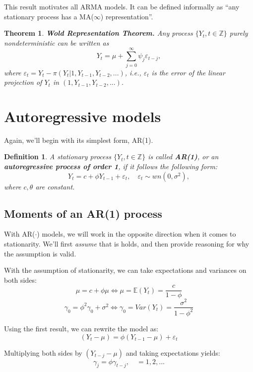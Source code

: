 \documentclass[11pt, a4paper]{report}
\theoremstyle{plain}
\newtheorem{thm}{Theorem}[section]
\theoremstyle{plain}
\newtheorem{defn}{Definition}[section]
\theoremstyle{remark}
\begin{document}
This result motivates all ARMA models. It can be defined informally as ``any stationary process has a MA($\infty$) representation''.

\begin{thm}{\textbf{Wold Representation Theorem.}}
	Any process $\{Y_t, t \in \mathbb{Z} \}$ purely nondeterministic can be written as
	$$ Y_t = \mu + \sum_{j=0}^{\infty} \psi_j \varepsilon_{t-j}, $$
	where $\varepsilon_{t} = Y_t - \pi(Y_t | 1, Y_{t-1}, Y_{t-2}, ...)$, i.e., $\varepsilon_{t}$ is the \textit{error of the linear projection of $Y_t$ in $(1, Y_{t-1}, Y_{t-2}, ...)$}.
\end{thm}

\section{Autoregressive models}

Again, we'll begin with its simplest form, AR(1).

\begin{defn} \label{ar1-def}
	A stationary process $\{Y_t, t \in \mathbb{Z} \}$ is called \textbf{AR(1)}, or an \textbf{autoregressive process of order 1}, if it follows the following form:
	$$ Y_t = c + \phi Y_{t-1} + \varepsilon_t, \hspace{1em} \varepsilon_t \sim wn(0, \sigma^2), $$
	where $c, \theta$ are constant.
\end{defn}

\subsection{Moments of an AR(1) process}

With AR($\cdot$) models, we will work in the opposite direction when it comes to stationarity. We'll first \textit{assume} that is holds, and then provide reasoning for why the assumption is valid.

With the assumption of stationarity, we can take expectations and variances on both sides:
$$ \mu = c + \phi \mu \iff \mu = \mathbb{E}(Y_t) = \dfrac{c}{1 - \phi} $$
$$ \gamma_{0} = \phi^2 \gamma_{0} + \sigma^2 \iff \gamma_{0} = Var(Y_t) = \dfrac{\sigma^2}{1 - \phi^2} $$

Using the first result, we can rewrite the model as:
$$ (Y_t - \mu) = \phi (Y_{t-1} - \mu) + \varepsilon_{t} $$

Multiplying both sides by $(Y_{t-j} - \mu)$ and taking expectations yields:
$$ \gamma_{j} = \phi \gamma_{t-j}, \hspace{1em} = 1,2,... $$
\end{document}
